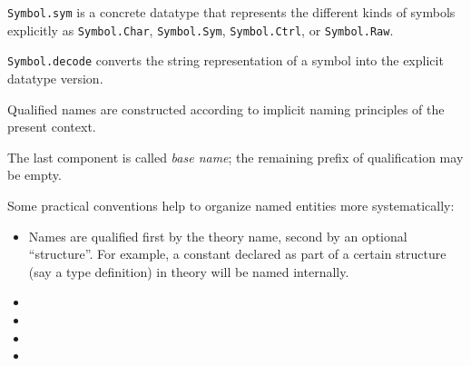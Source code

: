 \begin{isabellebody}
\begin{isamarkuptext}
\begin{description}
  \item \verb|Symbol.sym| is a concrete datatype that represents
  the different kinds of symbols explicitly as \verb|Symbol.Char|,
  \verb|Symbol.Sym|, \verb|Symbol.Ctrl|, or \verb|Symbol.Raw|.

  \item \verb|Symbol.decode| converts the string representation of a
  symbol into the explicit datatype version.

  \end{description}%
\end{isamarkuptext}%
\isamarkuptrue%
%
\endisatagmlref
{\isafoldmlref}%
%
\isadelimmlref
%
\endisadelimmlref
%
\isamarkuptrue%
%
\isadelimFIXME
%
\endisadelimFIXME
%
\isatagFIXME
%
\begin{isamarkuptext}%
Qualified names are constructed according to implicit naming
principles of the present context.


The last component is called \emph{base name}; the remaining prefix of
qualification may be empty.

Some practical conventions help to organize named entities more
systematically:

\begin{itemize}

\item Names are qualified first by the theory name, second by an
optional ``structure''.  For example, a constant  declared
as part of a certain structure  (say a type definition) in
theory  will be named  internally.

\item

\item

\item

\item

\end{itemize}


\end{isamarkuptext}
\end{isabellebody}
